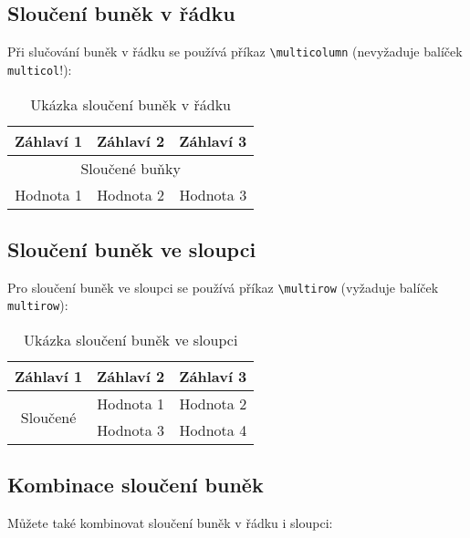 \subsection{Sloučení buněk v řádku}

Při slučování buněk v řádku se používá příkaz \texttt{\textbackslash multicolumn} (nevyžaduje balíček \texttt{multicol}!):

\begin{table}[h!]
    \centering
    \begin{tabular}{|c|c|c|}
        \hline
        \textbf{Záhlaví 1} & \textbf{Záhlaví 2} & \textbf{Záhlaví 3} \\
        \hline
        \multicolumn{3}{|c|}{Sloučené buňky} \\
        \hline
        Hodnota 1 & Hodnota 2 & Hodnota 3 \\
        \hline
    \end{tabular}
    \caption{Ukázka sloučení buněk v řádku}
    \label{tab:merged_row}
\end{table}

\newpage

\subsection{Sloučení buněk ve sloupci}

Pro sloučení buněk ve sloupci se používá příkaz \texttt{\textbackslash multirow} (vyžaduje balíček \texttt{multirow}):

\begin{table}[h!]
    \centering
    \begin{tabular}{|c|c|c|}
        \hline
        \textbf{Záhlaví 1} & \textbf{Záhlaví 2} & \textbf{Záhlaví 3} \\
        \hline
        \multirow{2}{*}{Sloučené} & Hodnota 1 & Hodnota 2 \\
        & Hodnota 3 & Hodnota 4 \\
        \hline
    \end{tabular}
    \caption{Ukázka sloučení buněk ve sloupci}
    \label{tab:merged_column}
\end{table}

\subsection{Kombinace sloučení buněk}

Můžete také kombinovat sloučení buněk v řádku i sloupci:

